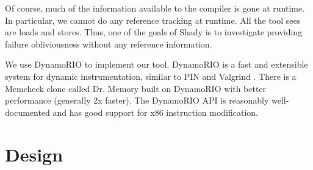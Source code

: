 \documentclass{article}
\begin{document}
Of course, much of the information available to the compiler is gone at runtime. In particular, we cannot do any reference tracking at runtime. All the tool sees are loads and stores. Thus, one of the goals of Shady is to investigate providing failure obliviousness without any reference information.

We use DynamoRIO to implement our tool.  DynamoRIO is a fast and extensible system for dynamic instrumentation, similar to PIN \cite{Luk05pin:building} and Valgrind \cite{Nethercote07valgrind:a}. There is a Memcheck \cite{Nethercote05memcheck} clone called Dr. Memory built on DynamoRIO with better performance (generally 2x faster). The DynamoRIO API is reasonably well-documented and has good support for x86 instruction modification.




\section{Design} %
\label{sec:Design}
\end{document}
